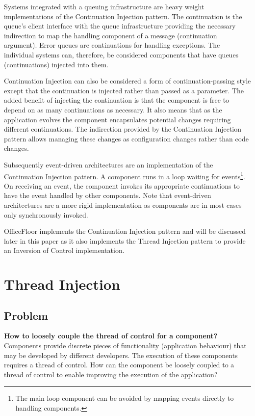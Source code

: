 \documentclass[prodmode]{style/acmlarge}
\begin{document}
Systems integrated with a queuing infrastructure are heavy weight
implementations of the Continuation Injection pattern.  The continuation is the
queue's client interface with the queue infrastructure providing the necessary
indirection to map the handling component of a message (continuation argument).
Error queues are continuations for handling exceptions.  The individual systems
can, therefore, be considered components that have queues (continuations)
injected into them.

Continuation Injection can also be considered a form of continuation-passing
style \cite{continuations} except that the continuation is injected rather than
passed as a parameter.  The added benefit of injecting the continuation is that
the component is free to depend on as many continuations as necessary.  It also
means that as the application evolves the component encapsulates potential
changes requiring different continuations.  The indirection provided by the
Continuation Injection pattern allows managing these changes as configuration
changes rather than code changes.

Subsequently event-driven architectures are an implementation of the
Continuation Injection pattern.  A component runs in a loop waiting for
events\footnote{The main loop component can be avoided by mapping events
directly to handling components.}.  On receiving an event, the component invokes
its appropriate continuations to have the event handled by other components. 
Note that event-driven architectures are a more rigid implementation as
components are in most cases only synchronously invoked.

OfficeFloor \cite{officefloor} implements the Continuation Injection pattern and
will be discussed later in this paper as it also implements the Thread Injection
pattern to provide an Inversion of Control implementation.



\section{Thread Injection}


\subsection{Problem}

\textbf{How to loosely couple the thread of control for a component?} 
Components provide discrete pieces of functionality (application behaviour) that
may be developed by different developers.  The execution of these components
requires a thread of control.  How can the component be loosely coupled to a
thread of control to enable improving the execution of the application?
\end{document}
